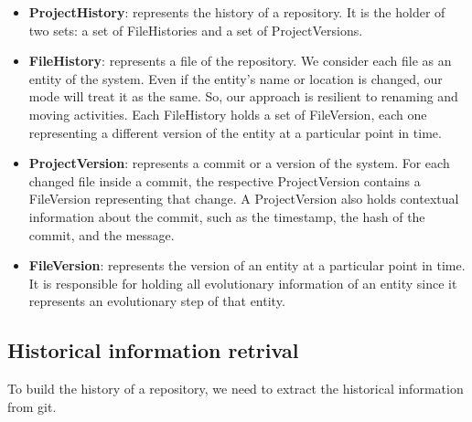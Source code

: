 \begin{itemize}
    \item \textbf{ProjectHistory}: represents the history of a repository. It is the holder of two sets: a set of FileHistories and a set of ProjectVersions. 
    \item \textbf{FileHistory}: represents a file of the repository. We consider each file as an entity of the system. Even if the entity's name or location is changed, our mode will treat it as the same. So, our approach is resilient to renaming and moving activities. Each FileHistory holds a set of FileVersion, each one representing a different version of the entity at a particular point in time.  
    \item \textbf{ProjectVersion}: represents a commit or a version of the system. 
    For each changed file inside a commit, the respective ProjectVersion contains a FileVersion representing that change.
    A ProjectVersion also holds contextual information about the commit, such as the timestamp, the hash of the commit, and the message.
    \item \textbf{FileVersion}: represents the version of an entity at a particular point in time.
    It is responsible for holding all evolutionary information of an entity since it represents an evolutionary step of that entity. 
\end{itemize}
\bigbreak

\subsection*{Historical information retrival}
To build the history of a repository, we need to extract the historical information from git.\\


